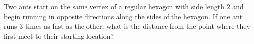 Two ants start on the same vertex of a regular hexagon with side length $2$ and begin running in opposite directions along the sides of the hexagon. If one ant runs $3$ times as fast as the other, what is the distance from the point where they first meet to their starting location?
